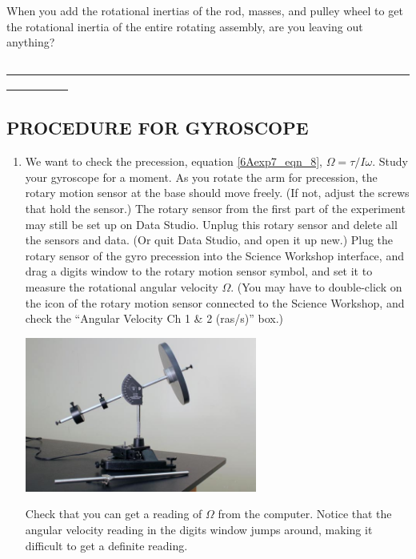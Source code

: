 \begin{enumerate}[label=\arabic*.]
When you add the rotational inertias of the rod, masses, and pulley wheel to get the rotational inertia of the entire rotating assembly, are you leaving out anything?

\ul{~~~~~~~~~~~~~~~~~~~~~~~~~~~~~~~~~~~~~~~~~~~~~~~~~~~~~~~~~~~~~~~~~~~~~~~~~~~~~~~~~~~}

\end{enumerate}

\subsection*{PROCEDURE FOR GYROSCOPE}

\begin{enumerate}[label=\arabic*.]

\item We want to check the precession, equation \ref{6Aexp7_eqn_8}, \(\Omega = \tau/I\omega\).  Study your gyroscope for a moment.  As you rotate the arm for precession, the rotary motion sensor at the base should move freely.  (If not, adjust the screws that hold the sensor.)  The rotary sensor from the first part of the experiment may still be set up on Data Studio.  Unplug this rotary sensor and delete all the sensors and data.  (Or quit Data Studio, and open it up new.)  Plug the rotary sensor of the gyro precession into the Science Workshop interface, and drag a digits window to the rotary motion sensor symbol, and set it to measure the rotational angular velocity \(\Omega\).  (You may have to double-click on the icon of the rotary motion sensor connected to the Science Workshop, and check the ``Angular Velocity Ch 1 \& 2 (ras/s)'' box.)
\begin{center} \includegraphics*[width=0.6\textwidth]{imgs/6labs/6Alab/6Aexp7/6A-EXP7_fig3_scaled.jpg} \end{center}
Check that you can get a reading of \(\Omega\) from the computer.  Notice that the angular velocity reading in the digits window jumps around, making it difficult to get a definite reading.


\end{enumerate}
